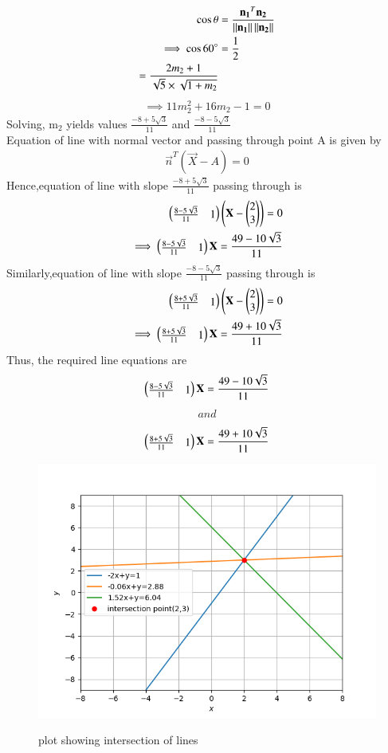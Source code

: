 \documentclass[journal,12pt,twocolumn]{IEEEtran}
\begin{document}
\begin{align}
\cos \theta &= \frac{\mathbf{n_1}^T\mathbf{n_2}}{\left\lVert\mathbf{n_1}\right\rVert\left\lVert\mathbf{n_2}\right\rVert}\\
\implies \cos 60\degree &=\frac{1}{2}\\ 
=\frac{2m_2+1}{\sqrt5\times\sqrt{1+m_2}}
\end{align}
 \begin{align}
 \implies 11m_2^2+16m_2-1=0
 \end{align}
 Solving, m$_2$ yields values $\frac{-8+5\sqrt{3}}{11}$ and $\frac{-8-5\sqrt{3}}{11}$ \\
 Equation of line with normal vector and passing through point A is given by
 \begin{align}
 \vec{n}^T(\vec{X}-A)=0
 \end{align}
  Hence,equation of line with slope $\frac{-8+5\sqrt{3}}{11}$ passing through  is
  \begin{align}
  \begin{pmatrix}\frac{8-5\sqrt{3}}{11}&1\end{pmatrix}\left(\mathbf{X}-\begin{pmatrix}2\\3\end{pmatrix}\right)=0\\
  \implies \begin{pmatrix}\frac{8-5\sqrt{3}}{11}&1\end{pmatrix}\mathbf{X}=\frac{49-10\sqrt{3}}{11}
  \end{align}
  Similarly,equation of line with slope $\frac{-8-5\sqrt{3}}{11}$ passing through  is
  \begin{align}
  \begin{pmatrix}\frac{8+5\sqrt{3}}{11}&1\end{pmatrix}\left(\mathbf{X}-\begin{pmatrix}2\\3\end{pmatrix}\right)=0\\
  \implies \begin{pmatrix}\frac{8+5\sqrt{3}}{11}&1\end{pmatrix}\mathbf{X}=\frac{49+10\sqrt{3}}{11}
  \end{align}
  Thus, the required line equations are
  \begin{align}
  \begin{pmatrix}\frac{8-5\sqrt{3}}{11}&1\end{pmatrix}\mathbf{X}=\frac{49-10\sqrt{3}}{11} 
  \end{align}
  \begin{align}
  and
  \end{align}
  \begin{align}
   \begin{pmatrix}\frac{8+5\sqrt{3}}{11}&1\end{pmatrix}\mathbf{X}=\frac{49+10\sqrt{3}}{11}
  \end{align}
  \begin{figure}[!ht]
  \centering
  \includegraphics[width=\columnwidth]{plot.png}
  \label{fig:}
  \caption{plot showing intersection of lines}
  \end{figure}
\end{document}
